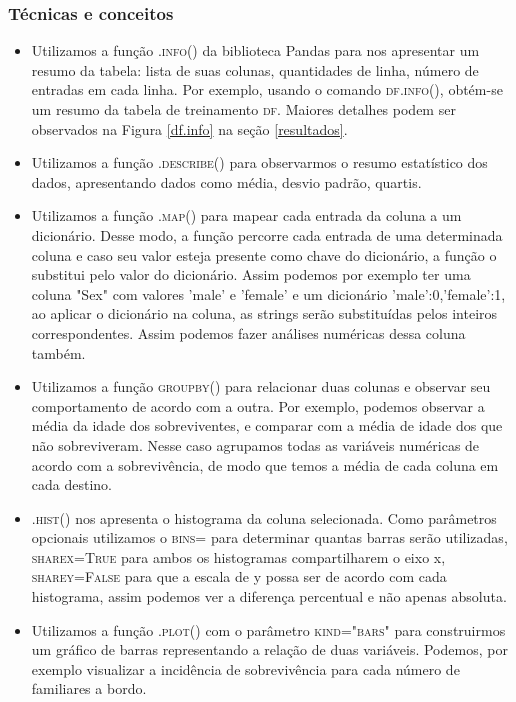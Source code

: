 \documentclass{article}
\begin{document}
\subsubsection{Técnicas e conceitos}
\begin{itemize}
\item Utilizamos a função \textsc{.info()} da biblioteca Pandas para nos apresentar um resumo da tabela: lista de suas colunas, quantidades de linha, número de entradas em cada linha. Por exemplo, usando o comando \textsc{df.info()}, obtém-se um resumo da tabela de treinamento \textsc{df}. Maiores detalhes podem ser observados na Figura \ref{df.info} na seção \ref{resultados}.
\item Utilizamos a função \textsc{.describe()} para observarmos o resumo estatístico dos dados, apresentando dados como média, desvio padrão, quartis. 
\item Utilizamos a função \textsc{.map()} para mapear cada entrada da coluna a um dicionário. Desse modo, a função percorre cada entrada de uma determinada coluna e caso seu valor esteja presente como chave do dicionário, a função o substitui pelo valor do dicionário. Assim podemos por exemplo ter uma coluna "Sex" com valores 'male' e 'female' e um dicionário {'male':0,'female':1}, ao aplicar o dicionário na coluna, as strings serão substituídas pelos inteiros correspondentes. Assim podemos fazer análises numéricas dessa coluna também. 
\item Utilizamos a função \textsc{groupby()} para relacionar duas colunas e observar seu comportamento de acordo com a outra. Por exemplo, podemos observar a média da idade dos sobreviventes, e comparar com a média de idade dos que não sobreviveram. Nesse caso agrupamos todas as variáveis numéricas de acordo com a sobrevivência, de modo que temos a média de cada coluna em cada destino.
\item \textsc{.hist()} nos apresenta o histograma da coluna selecionada. Como parâmetros opcionais utilizamos o \textsc{bins=} para determinar quantas barras serão utilizadas, \textsc{sharex=True} para ambos os histogramas compartilharem o eixo x, \textsc{sharey=False} para que a escala de y possa ser de acordo com cada histograma, assim podemos ver a diferença percentual e não apenas absoluta.
\item Utilizamos a função \textsc{.plot()} com o parâmetro \textsc{kind="bars"} para construirmos um gráfico de barras representando a relação de duas variáveis. Podemos, por exemplo visualizar a incidência de sobrevivência para cada número de familiares a bordo. 
\end{itemize}
\end{document}
